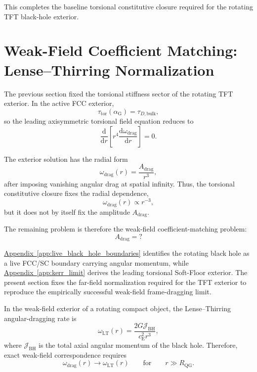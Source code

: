 This completes the baseline torsional constitutive closure required for the rotating TFT black-hole exterior.

\section{Weak-Field Coefficient Matching: Lense--Thirring Normalization}

The previous section fixed the torsional stiffness sector of the rotating TFT exterior. In the active FCC exterior,
\begin{equation}
    \tau_{\mathrm{tor}}(\alpha_{\mathrm{G}}) = \tau_{D,\mathrm{bulk}},
\end{equation}
so the leading axisymmetric torsional field equation reduces to
\begin{equation}
    \frac{\mathrm{d}}{\mathrm{d}r} \left[ r^4 \frac{\mathrm{d}\omega_{\mathrm{drag}}}{\mathrm{d}r} \right] = 0.
\end{equation}

The exterior solution has the radial form
\begin{equation}
    \omega_{\mathrm{drag}}(r) = \frac{A_{\mathrm{drag}}}{r^3},
\end{equation}
after imposing vanishing angular drag at spatial infinity. Thus, the torsional constitutive closure fixes the radial dependence,
\begin{equation}
    \omega_{\mathrm{drag}}(r) \propto r^{-3},
\end{equation}
but it does not by itself fix the amplitude $A_{\mathrm{drag}}$.

The remaining problem is therefore the weak-field coefficient-matching problem:
\begin{equation}
    A_{\mathrm{drag}} = ?
\end{equation}

\hyperref[app:live_black_hole_boundaries]{Appendix~\ref*{app:live_black_hole_boundaries}} identifies the rotating black hole as a live FCC/SC boundary carrying angular momentum, while \hyperref[app:kerr_limit]{Appendix~\ref*{app:kerr_limit}} derives the leading torsional Soft-Floor exterior. The present section fixes the far-field normalization required for the TFT exterior to reproduce the empirically successful weak-field frame-dragging limit.

In the weak-field exterior of a rotating compact object, the Lense--Thirring angular-dragging rate is
\begin{equation}
    \omega_{\mathrm{LT}}(r) = \frac{2G\mathcal{J}_{\mathrm{BH}}}{c_{\mathrm{E}}^2r^3},
\end{equation}
where $\mathcal{J}_{\mathrm{BH}}$ is the total axial angular momentum of the black hole. Therefore, exact weak-field correspondence requires
\begin{equation}
    \omega_{\mathrm{drag}}(r) \rightarrow \omega_{\mathrm{LT}}(r) \qquad \text{for} \qquad r \gg R_{\mathrm{QG}}.
\end{equation}

